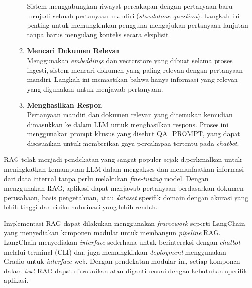 \begin{enumerate}
\begin{enumerate}
		            Sistem menggabungkan riwayat percakapan dengan pertanyaan baru menjadi sebuah pertanyaan mandiri (\textit{standalone question}). Langkah ini penting untuk memungkinkan pengguna mengajukan pertanyaan lanjutan tanpa harus mengulang konteks secara eksplisit.
		      \item \textbf{Mencari Dokumen Relevan} \\
		            Menggunakan \textit{embeddings} dan vectorstore yang dibuat selama proses ingesti, sistem mencari dokumen yang paling relevan dengan pertanyaan mandiri. Langkah ini memastikan bahwa hanya informasi yang relevan yang digunakan untuk menjawab pertanyaan.
		      \item \textbf{Menghasilkan Respon} \\
		            Pertanyaan mandiri dan dokumen relevan yang ditemukan kemudian dimasukkan ke dalam LLM untuk menghasilkan respons. Proses ini menggunakan prompt khusus yang disebut QA\_PROMPT, yang dapat disesuaikan untuk memberikan gaya percakapan tertentu pada \textit{chatbot}.
	      \end{enumerate}
\end{enumerate}

RAG telah menjadi pendekatan yang sangat populer sejak diperkenalkan untuk meningkatkan kemampuan LLM dalam mengakses dan memanfaatkan informasi dari data internal tanpa perlu melakukan \textit{fine-tuning} model. Dengan menggunakan RAG, aplikasi dapat menjawab pertanyaan berdasarkan dokumen perusahaan, basis pengetahuan, atau \textit{dataset} spesifik domain dengan akurasi yang lebih tinggi dan risiko halusinasi yang lebih rendah.

Implementasi RAG dapat dilakukan menggunakan \textit{framework} seperti LangChain yang menyediakan komponen modular untuk membangun \textit{pipeline} RAG. LangChain menyediakan \textit{interface} sederhana untuk berinteraksi dengan \textit{chatbot} melalui terminal (CLI) dan juga memungkinkan \textit{deployment} menggunakan Gradio untuk \textit{interface} web. Dengan pendekatan modular ini, setiap komponen dalam \textit{text} RAG dapat disesuaikan atau diganti sesuai dengan kebutuhan spesifik aplikasi.

